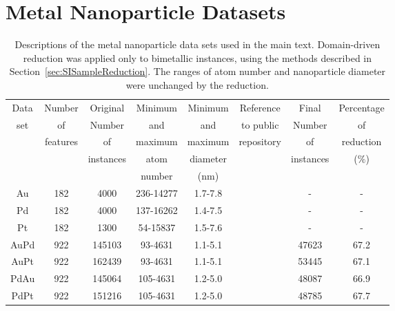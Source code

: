 \documentclass[12pt]{article}
\begin{document}
\section{Metal Nanoparticle Datasets}
\label{sec:rawDatasets}

\begin{table}[htbp!]
\caption{Descriptions of the metal nanoparticle data sets used in the main text. Domain-driven reduction was applied only to bimetallic instances, using the methods described in Section~\ref{sec:SISampleReduction}. The ranges of atom number and nanoparticle diameter were unchanged by the reduction.}
\centering
\small
    \begin{tabular}{c|ccccc|cc}
            \hline
            Data            & Number   & Original  & Minimum   & Minimum  & Reference                & Final     & Percentage \\
            set             & of       & Number    & and       & and      & to public                & Number    & of         \\
                            & features & of        & maximum   & maximum  & repository               & of        & reduction  \\
                            &          & instances & atom      & diameter &                          & instances\tnote{a} & ($\%$)     \\
                            &          &           & number    & (nm)     &                          &           &            \\
            \hline
            Au      &      182 &      4000 & 236-14277 &  1.7-7.8 & \cite{Barnard2019AuData} &           - &        - \\
            Pd      &      182 &      4000 & 137-16262 &  1.4-7.5 & \cite{Barnard2019PdData} &           - &        - \\
            Pt      &      182 &      1300 &  54-15837 &  1.5-7.6 & \cite{Barnard2019PtData} &           - &        - \\
            AuPd    &      922 &    145103 &   93-4631 &  1.1-5.1 &  \cite{Ting2023AuPdData} &       47623 &     67.2 \\
            AuPt    &      922 &    162439 &   93-4631 &  1.1-5.1 &  \cite{Ting2023AuPtData} &       53445 &     67.1 \\
            PdAu    &      922 &    145064 &  105-4631 &  1.2-5.0 &  \cite{Ting2023PdAuData} &       48087 &     66.9 \\
            PdPt    &      922 &    151216 &  105-4631 &  1.2-5.0 &  \cite{Ting2023PdPtData} &       48785 &     67.7 \\

\end{tabular}
\end{table}
\end{document}
